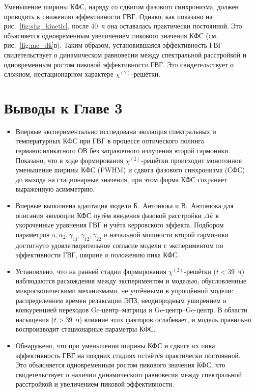 Уменьшение ширины КФС, наряду со сдвигом фазового синхронизма, должен приводить к снижению эффективности ГВГ. Однако, как показано на рис.~\cref{fig:shg_kinetic}, после 40~ч она оставалась практически постоянной. Это объясняется одновременным увеличением пикового значения КФС (см. рис.~\cref{fig:mc_dk}в). Таким образом, установившаяся эффективность ГВГ свидетельствует о динамическом равновесии между спектральной расстройкой и одновременным ростом пиковой эффективности ГВГ. Это свидетельствует о сложном, нестационарном характере \(\chi^{(2)}\)-решётки.

\section{Выводы к Главе 3}

\begin{itemize}
	\item Впервые экспериментально исследована эволюция спектральных и температурных КФС при ГВГ в процессе оптического полинга германосиликатного ОВ без затравочного излучения второй гармоники. Показано, что в ходе формирования 
	\(\chi^{(2)}\)-решётки происходит монотонное уменьшение ширины КФС (FWHM) и сдвига фазового синхронизма (СФС) до выхода на стационарные значения, при этом форма КФС сохраняет выраженную асимметрию.
	
	\item Впервые выполнена адаптация модели Б.~Антонюка и В.~Антонюка \cite{antonyuk2001self} для описания эволюции КФС путём введения фазовой расстройки $\Delta k$ в укороченные уравнения ГВГ и учёта керровского эффекта. Подбором параметров \(u, \alpha_2, \gamma_{11}, \gamma_{12}, \gamma_{22}\) и начальной мощности второй гармоники достигнуто удовлетворительное согласие модели с экспериментом по эффективности ГВГ, ширине и положению пика КФС.
	
	\item Установлено, что на ранней стадии формирования 
	\(\chi^{(2)}\)-решётки (\(t < 39\)~ч) наблюдаются расхождения между экспериментом и моделью, обусловленные микроскопическими механизмами, не учтёнными в упрощённой модели: распределением времен релаксации ЭПЗ, неоднородным уширением и конкуренцией переходов Ge-центр–матрица и Ge-центр–Ge-центр. В области насыщения (\(t > 39\)~ч) влияние этих факторов ослабевает, и модель правильно воспроизводит стационарные параметры КФС.
	
	\item Обнаружено, что при уменьшении ширины КФС и сдвиге их пика эффективность ГВГ на поздних стадиях остаётся практически постоянной. Это объясняется одновременным ростом пикового значения КФС, что свидетельствует о наличии динамического равновесия между спектральной расстройкой и увеличением пиковой эффективности.
\end{itemize}

\FloatBarrier